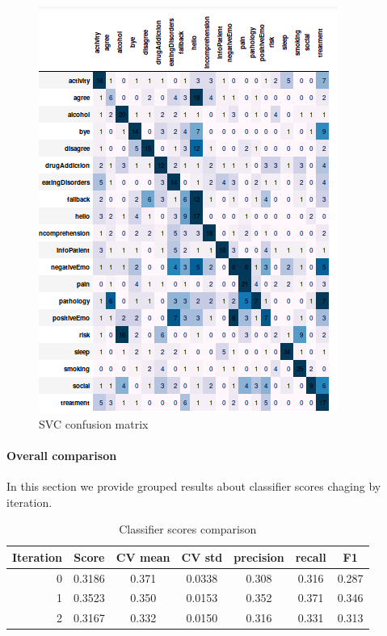 \documentclass[11pt]{article}
\begin{document}
{\begin{figure}[h]
	\centering
	\includegraphics[scale=0.40]{svc2_cm.png}
	\caption{SVC confusion matrix}
\label{lda_gm_cm}
\end{figure}
\FloatBarrier

\paragraph{Overall comparison}

In this section we provide grouped results about classifier scores chaging by iteration. 

\begin{table}[htb]
\begin{center}
\begin{tabular}{ |r|c|c|c|c|c|c| }
\hline
Iteration 	& Score  & CV mean & CV std & precision & recall & F1 \\ \hline
0			& 0.3186 & 0.371   & 0.0338 & 0.308 	& 0.316  & 0.287 \\ \hline
1			& 0.3523 & 0.350   & 0.0153 & 0.352 	& 0.371  & 0.346 \\ \hline
2 			& 0.3167 & 0.332   & 0.0150 & 0.316 	& 0.331  & 0.313 \\ \hline
\end{tabular}
\caption{Classifier scores comparison}
\end{center}
\end{table}
\FloatBarrier

}
\end{document}
